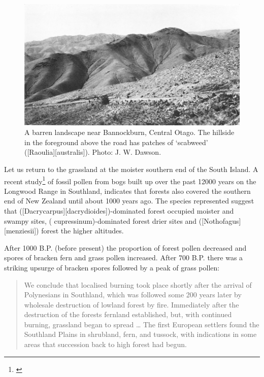 \begin{figure}[t]
	\centering
	\includegraphics[width=\textwidth]{graphics/fig_086}
	\caption[A barren landscape near Bannockburn]{A barren landscape near Bannockburn, Central Otago.
	The hillside in the foreground above the road has patches of `scabweed' ([Raoulia][australis]).
	Photo:  J. W. Dawson.}%
	\label{fig:86barren}
\end{figure}

Let us return to the  grassland at the moister southern end of the South Island.
A recent study\footnote{\cite{mcglone1983vegetation}} of fossil pollen from bogs built up over the past 12000 years on the Longwood Range in Southland, indicates that forests also covered the southern end of New Zealand until about 1000 years ago.
The species represented suggest that  ([Dacrycarpus][dacrydioides])-dominated forest occupied moister and swampy sites,  ( cupressinum)-dominated forest drier sites and  ([Nothofagus][menziesii]) forest the higher altitudes.

After 1000 B.P. (before present) the proportion of forest pollen decreased and spores of bracken fern and grass pollen increased.
After 700 B.P. there was a striking upsurge of bracken spores followed by a peak of grass pollen:

\begin{quote}
	We conclude that localised burning took place shortly after the arrival of Polynesians in Southland, which was followed some 200 years later by wholesale destruction of lowland forest by fire.
	Immediately after the destruction of the forests fernland established, but, with continued burning, grassland began to spread … The first European settlers found the Southland Plains in shrubland, fern, and tussock, with indications in some areas that succession back to high forest had begun.
\end{quote}

